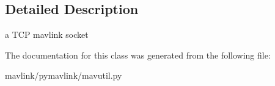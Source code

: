 \subsection{Detailed Description}
\begin{DoxyVerb}a TCP mavlink socket\end{DoxyVerb}
 

The documentation for this class was generated from the following file\+:\begin{DoxyCompactItemize}
\item 
mavlink/pymavlink/mavutil.\+py\end{DoxyCompactItemize}
